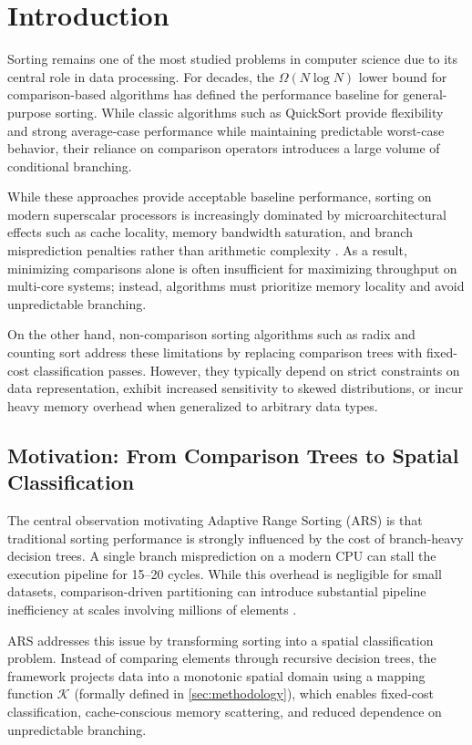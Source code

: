 \section{Introduction}
Sorting remains one of the most studied problems in computer science due to its central role in data processing.
For decades, the $\Omega(N \log N)$ lower bound for comparison-based algorithms has defined the performance baseline for general-purpose sorting.
While classic algorithms such as QuickSort \cite{10.1093/comjnl/5.1.10} provide flexibility and strong average-case performance while maintaining predictable worst-case behavior, their reliance on comparison operators introduces a large volume of conditional branching.

While these approaches provide acceptable baseline performance, sorting on modern superscalar processors is increasingly dominated by microarchitectural effects such as cache locality, memory bandwidth saturation, and branch misprediction penalties rather than arithmetic complexity \cite{frigoCacheobliviousAlgorithms1999b, wulfHittingMemoryWall1995}.
As a result, minimizing comparisons alone is often insufficient for maximizing throughput on multi-core systems; instead, algorithms must prioritize memory locality and avoid unpredictable branching.

On the other hand, non-comparison sorting algorithms such as radix and counting sort \cite{cormenIntroductionAlgorithms2022} address these limitations by replacing comparison trees with fixed-cost classification passes.
However, they typically depend on strict constraints on data representation, exhibit increased sensitivity to skewed distributions, or incur heavy memory overhead when generalized to arbitrary data types.

\subsection{Motivation: From Comparison Trees to Spatial Classification}
The central observation motivating Adaptive Range Sorting (ARS) is that traditional sorting performance is strongly influenced by the cost of branch-heavy decision trees.
A single branch misprediction on a modern CPU can stall the execution pipeline for 15--20 cycles.
While this overhead is negligible for small datasets, comparison-driven partitioning can introduce substantial pipeline inefficiency at scales involving millions of elements \cite{kaligosiHowBranchMispredictions2006}.

ARS addresses this issue by transforming sorting into a spatial classification problem.
Instead of comparing elements through recursive decision trees, the framework projects data into a monotonic spatial domain using a mapping function $\mathcal{K}$ (formally defined in \cref{sec:methodology}), which enables fixed-cost classification, cache-conscious memory scattering, and reduced dependence on unpredictable branching.

